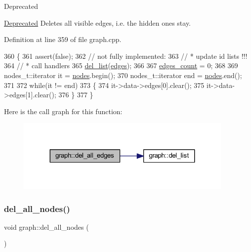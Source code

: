 \begin{DoxyRefDesc}{Deprecated}
\item[\mbox{\hyperlink{deprecated__deprecated000002}{Deprecated}}]Deletes all visible edges, i.\+e. the hidden ones stay. \end{DoxyRefDesc}


Definition at line 359 of file graph.\+cpp.


\begin{DoxyCode}
360 \{
361     assert(\textcolor{keyword}{false});
362     \textcolor{comment}{// not fully implemented:}
363     \textcolor{comment}{//  * update id lists !!!}
364     \textcolor{comment}{//  * call handlers}
365     \mbox{\hyperlink{classgraph_a23f0a5fb311b7d71bb9dfc4e8aedef35}{del\_list}}(\mbox{\hyperlink{classgraph_ab5b1c610cca1bcf72b05aacc28a48153}{edges}});
366 
367     \mbox{\hyperlink{classgraph_af560ff4263ad165c166a46084e781b4a}{edges\_count}} = 0;
368     
369     nodes\_t::iterator it = \mbox{\hyperlink{classgraph_a4ea0592e8eb7c26c5abad24546907726}{nodes}}.begin();
370     nodes\_t::iterator end = \mbox{\hyperlink{classgraph_a4ea0592e8eb7c26c5abad24546907726}{nodes}}.end();
371 
372     \textcolor{keywordflow}{while}(it != end)
373     \{
374     it->data->edges[0].clear();
375     it->data->edges[1].clear();
376     \}
377 \}
\end{DoxyCode}
Here is the call graph for this function\+:\nopagebreak
\begin{figure}[H]
\begin{center}
\leavevmode
\includegraphics[width=299pt]{classgraph_aae52be443c5aef001b5f6758855f15ad_cgraph}
\end{center}
\end{figure}
\mbox{\label{classgraph_ad0ca1578643a51f96a76a846f14558df}} 
\subsubsection{\texorpdfstring{del\+\_\+all\+\_\+nodes()}{del\_all\_nodes()}}
{\footnotesize\ttfamily void graph\+::del\+\_\+all\+\_\+nodes (\begin{DoxyParamCaption}{ }\end{DoxyParamCaption})\hspace{0.3cm}{\ttfamily [inherited]}}

